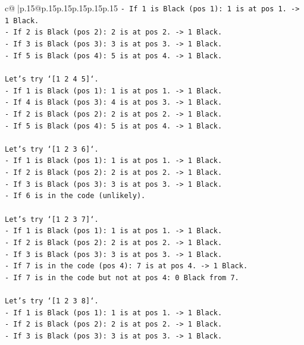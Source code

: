 \documentclass{article}
\begin{document}
{\begin{supertabular}{c@{$\;$}|p{.15\linewidth}@{}p{.15\linewidth}p{.15\linewidth}p{.15\linewidth}p{.15\linewidth}p{.15\linewidth}}
{{{\texttt{{-} If 1 is Black (pos 1): 1 is at pos 1. {-}> 1 Black.} \\
\texttt{{-} If 2 is Black (pos 2): 2 is at pos 2. {-}> 1 Black.} \\
\texttt{{-} If 3 is Black (pos 3): 3 is at pos 3. {-}> 1 Black.} \\
\texttt{{-} If 5 is Black (pos 4): 5 is at pos 4. {-}> 1 Black.} \\
\\ 
\texttt{Let's try `{[}1 2 4 5{]}`.} \\
\texttt{{-} If 1 is Black (pos 1): 1 is at pos 1. {-}> 1 Black.} \\
\texttt{{-} If 4 is Black (pos 3): 4 is at pos 3. {-}> 1 Black.} \\
\texttt{{-} If 2 is Black (pos 2): 2 is at pos 2. {-}> 1 Black.} \\
\texttt{{-} If 5 is Black (pos 4): 5 is at pos 4. {-}> 1 Black.} \\
\\ 
\texttt{Let's try `{[}1 2 3 6{]}`.} \\
\texttt{{-} If 1 is Black (pos 1): 1 is at pos 1. {-}> 1 Black.} \\
\texttt{{-} If 2 is Black (pos 2): 2 is at pos 2. {-}> 1 Black.} \\
\texttt{{-} If 3 is Black (pos 3): 3 is at pos 3. {-}> 1 Black.} \\
\texttt{{-} If 6 is in the code (unlikely).} \\
\\ 
\texttt{Let's try `{[}1 2 3 7{]}`.} \\
\texttt{{-} If 1 is Black (pos 1): 1 is at pos 1. {-}> 1 Black.} \\
\texttt{{-} If 2 is Black (pos 2): 2 is at pos 2. {-}> 1 Black.} \\
\texttt{{-} If 3 is Black (pos 3): 3 is at pos 3. {-}> 1 Black.} \\
\texttt{{-} If 7 is in the code (pos 4): 7 is at pos 4. {-}> 1 Black.} \\
\texttt{{-} If 7 is in the code but not at pos 4: 0 Black from 7.} \\
\\ 
\texttt{Let's try `{[}1 2 3 8{]}`.} \\
\texttt{{-} If 1 is Black (pos 1): 1 is at pos 1. {-}> 1 Black.} \\
\texttt{{-} If 2 is Black (pos 2): 2 is at pos 2. {-}> 1 Black.} \\
\texttt{{-} If 3 is Black (pos 3): 3 is at pos 3. {-}> 1 Black.} \\
}}}
\end{supertabular}}
\end{document}
